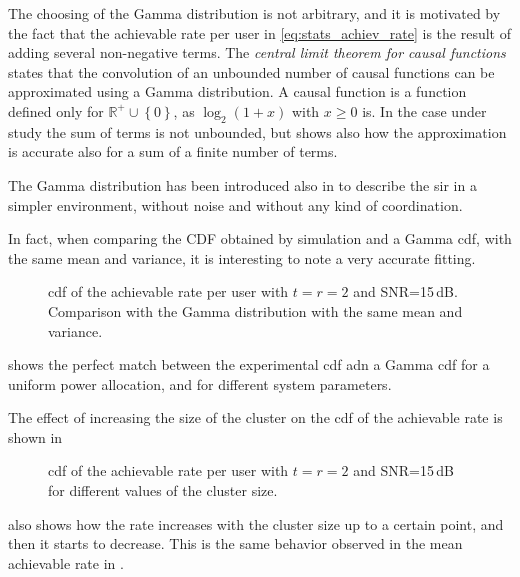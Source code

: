 The choosing of the Gamma distribution is not arbitrary, and it is motivated by
the fact that the achievable rate per user in \eqref{eq:stats_achiev_rate} is
the result of adding several non-negative terms. The \emph{central limit theorem
for causal functions} \cite{papoulis_fourier} states that the convolution of an
unbounded number of causal functions can be approximated using a Gamma
distribution. A causal function is a function defined only for $\mathbb{R}^{+}
\cup \left\{0\right\}$, as $\log_2\left(1+x\right)$ with $x \geq 0$ is. In the
case under study the sum of terms is not unbounded, but \cite{papoulis_fourier}
shows also how the approximation is accurate also for a sum of a finite number
of terms.

The Gamma distribution has been introduced also in \cite{cheikh11} to describe
the \gls{sir} in a simpler environment, without noise and without any kind of
coordination.

In fact, when comparing the CDF obtained by simulation and a Gamma \gls{cdf},
with the same mean and variance, it is interesting to note a very accurate
fitting.

\begin{figure}[t]
\begin{center}
   \dummybox
\end{center}
\caption{\gls{cdf} of the achievable rate per user with $t=r=2$ and
SNR=15\,dB. Comparison with the Gamma distribution with the same mean and
variance.}
\label{fig:cdf_sim_analy}
\end{figure}

 shows the perfect match between the experimental
\gls{cdf} adn a Gamma \gls{cdf} for a uniform power allocation, and for
different system parameters.

The effect of increasing the size of the cluster on the \gls{cdf} of the
achievable rate is shown in 

\begin{figure}[t]
\begin{center}
   \dummybox
\end{center}
\caption{\gls{cdf} of the achievable rate per user with $t=r=2$ and
SNR=15\,dB for different values of the cluster size.}
\label{fig:cdf_cluster_size}
\end{figure}

 also shows how the rate increases with the cluster
size up to a certain point, and then it starts to decrease. This is the same
behavior observed in the mean achievable rate in .

